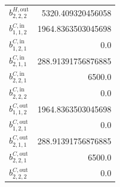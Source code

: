 \documentclass{article}%
\begin{document}
\begin{multicols*}{3}
\begin{supertabular}{lr}
	$b_{2,2,2}^{H,\text{out}}$ & 5320.409320456058 \\%
	$b_{1,1,2}^{C,\text{in}}$ & 1964.8363503045698 \\%
	$b_{1,2,1}^{C,\text{in}}$ & 0.0 \\%
	$b_{2,1,1}^{C,\text{in}}$ & 288.91391756876885 \\%
	$b_{2,2,1}^{C,\text{in}}$ & 6500.0 \\%
	$b_{2,2,2}^{C,\text{in}}$ & 0.0 \\%
	$b_{1,1,2}^{C,\text{out}}$ & 1964.8363503045698 \\%
	$b_{1,2,1}^{C,\text{out}}$ & 0.0 \\%
	$b_{2,1,1}^{C,\text{out}}$ & 288.91391756876885 \\%
	$b_{2,2,1}^{C,\text{out}}$ & 6500.0 \\%
	$b_{2,2,2}^{C,\text{out}}$ & 0.0 \\%
\end{supertabular}%
\end{multicols*}%
\end{document}
